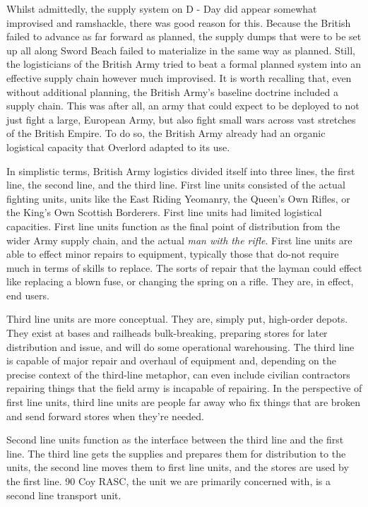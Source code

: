 \documentclass[noraggedright]{turabian-researchpaper}
\begin{document}
Whilst admittedly, the supply system on D - Day did appear somewhat improvised
and ramshackle, there was good reason for this.  Because the British failed to
advance as far forward as planned, the supply dumps that were to be set up all
along Sword Beach failed to materialize in the same way as planned.  Still,
the logisticians of the British Army tried to beat a formal planned system
into an effective supply chain however much improvised.  It is worth recalling
that, even without additional planning, the British Army's baseline doctrine 
included a supply chain.  This was after all, an army that could expect to be
deployed to not just fight a large, European Army, but also fight small wars
across vast stretches of the British Empire.  To do so, the British Army already
had an organic logistical capacity that Overlord adapted to its use.  

In simplistic terms, British Army logistics divided itself into three lines, 
the first line, the second line, and the third line.  First line units 
consisted of the actual fighting units, units like the East Riding Yeomanry,
the Queen's Own Rifles, or the King's Own Scottish Borderers.  First line 
units had limited logistical capacities.  First line units function as the 
final point of distribution from the wider Army supply chain, and the actual 
\textit{man with the rifle}.  First line units are able to effect minor repairs
to equipment, typically those that do-not require much in terms of skills to 
replace.  The sorts of repair that the layman could effect like replacing a 
blown fuse, or changing the spring on a rifle.  They are, in effect, end 
users.\autocite[s. 58(1)i, s. 102]{FSR1}

Third line units are more conceptual.  They are, simply put, high-order depots. 
They exist at bases and railheads bulk-breaking, preparing stores for later 
distribution and issue, and will do some operational warehousing.\autocite
[s. 105(2)]{FSR1} The third line is capable of major 
repair and overhaul of equipment and, depending on the precise context of the 
third-line metaphor, can even include civilian contractors repairing things
that the field army is incapable of repairing.  In the perspective of first 
line units, third line units are people far away who fix things that are 
broken and send forward stores when they're needed.

Second line units function as the interface between the third line and the
first line.\autocite[s. 101]{FSR1}  The third line gets the supplies and 
prepares them for distribution to the units, the second line moves them to 
first line units, and the stores are used by the first line.  90 Coy RASC, 
the unit we are primarily concerned with, is a second line transport unit.
\end{document}
